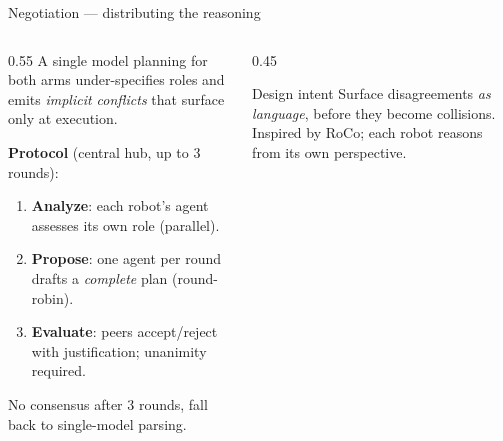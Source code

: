 \documentclass[aspectratio=169,11pt]{beamer}
\begin{document}
\begin{frame}{Negotiation --- distributing the reasoning}
	\begin{columns}[T]
		\begin{column}{0.55\textwidth}
			\footnotesize
			A single model planning for both arms under-specifies roles and emits
			\emph{implicit conflicts} that surface only at execution.
			\vspace{0.4em}

			\textbf{Protocol} (central hub, up to 3 rounds):
			\begin{enumerate}
				\item \textbf{Analyze}: each robot's agent assesses its own role (parallel).
				\item \textbf{Propose}: one agent per round drafts a \emph{complete} plan (round-robin).
				\item \textbf{Evaluate}: peers accept/reject with justification; \alert{unanimity} required.
			\end{enumerate}
			\vspace{0.3em}
			No consensus after 3 rounds, fall back to single-model parsing.
		\end{column}
		\begin{column}{0.45\textwidth}
			\begin{block}{Design intent}
				\footnotesize Surface disagreements \emph{as language}, before they become
				collisions. Inspired by RoCo; each robot reasons from its own perspective.
			\end{block}
		\end{column}
	\end{columns}
\end{frame}
\end{document}

